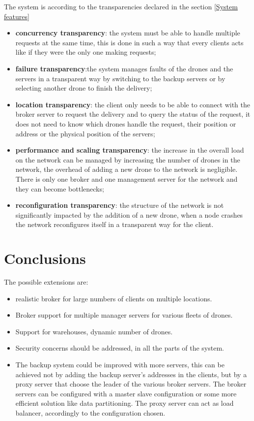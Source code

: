 \documentclass[a4paper, oneside]{memoir}
\begin{document}
The system is according to the transparencies declared in the section \ref{System features} 
\begin{itemize}
	\item \textbf{concurrency transparency}: the system must be able to handle multiple requests at the same time, this is done in such a way that every clients acts like if they were the only one making requests;
	\item \textbf{failure transparency}:the system manages faults of the drones and the servers in a transparent way by switching to the backup servers or by selecting another drone to finish the delivery;
	\item \textbf{location transparency}: the client only needs to be able to connect with the broker server to request the delivery and to query the status of the request, it does not need to know which drones handle the request, their position or address or the physical position of the servers;
	\item \textbf{performance and scaling transparency}: the increase in the overall load on the network can be managed by increasing the number of drones in the network, the overhead of adding a new drone to the network is negligible. There is only one broker and one management server for the network and they can become bottlenecks;
	\item \textbf{reconfiguration transparency}: the structure of the network is not significantly impacted by the addition of a new drone, when a node crashes the network reconfigures itself in a transparent way for the client.
\end{itemize}


\chapter{Conclusions}

The possible extensions are:
\begin{itemize}
	\item realistic broker for large numbers of clients on multiple locations.
	\item Broker support for multiple manager servers for various fleets of drones.
	\item Support for warehouses, dynamic number of drones.
	\item Security concerns should be addressed, in all the parts of the system.
	\item The backup system could be improved with more servers, this can be achieved not by adding the backup server's addresses in the clients, but by a proxy server that choose the leader of the various broker servers. The broker servers can be configured with a master slave configuration or some more efficient solution like data partitioning. The proxy server can act as load balancer, accordingly to the configuration chosen.
\end{itemize}
\end{document}
